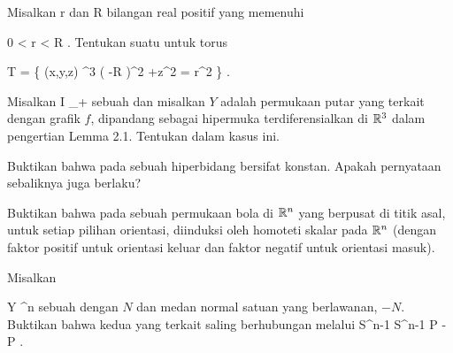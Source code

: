 {}
{

Misalkan
\mathkor {} {r} {dan} {R} {}
bilangan real positif yang memenuhi

\mavergleichskette
{\vergleichskette
{ 0
}
{ < }{ r
}
{ < }{ R
}
{    }{
}
{   }{
}
}
{}{}{.}
Tentukan suatu
untuk torus
 {} {}

\mavergleichskettedisp
{\vergleichskette
{ T
}
{ =} { \left\{ (x,y,z) \in \R^3  \mid   \left(   -R  \right)^2 +z^2  = r^2         \right\}
}
{ } {
}
{ } {
}
{ } {
}
}
{}{}{.}

}
{} {}

{}
{

Misalkan
 { I } {\R_+
} {}
sebuah
dan misalkan $Y$ adalah permukaan putar yang terkait dengan grafik $f$, dipandang sebagai hipermuka terdiferensialkan di ${\mathbb R}^3$ dalam pengertian
Lemma 2.1.
Tentukan
dalam kasus ini.

}
{} {}

{}
{

Buktikan bahwa
pada sebuah hiperbidang bersifat konstan. Apakah pernyataan sebaliknya juga berlaku?

}
{} {}

{}
{

Buktikan bahwa
pada sebuah permukaan bola di ${\mathbb R}^n$ yang berpusat di titik asal, untuk setiap pilihan orientasi, diinduksi oleh homoteti skalar pada ${\mathbb R}^n$ (dengan faktor positif untuk orientasi keluar dan faktor negatif untuk orientasi masuk).

}
{} {}

{}
{

Misalkan

\mavergleichskette
{\vergleichskette
{ Y
}
{ \subseteq }{ \R^n
}
{  }{
}
{    }{
}
{   }{
}
}
{}{}{}
sebuah
dengan
$N$ dan medan normal satuan yang berlawanan, $-N$. Buktikan bahwa kedua
yang terkait saling berhubungan melalui
\maabbeledisp {} {S^{n-1}} {S^{n-1}
} { P } { -P
} {.}

}
{} {}

